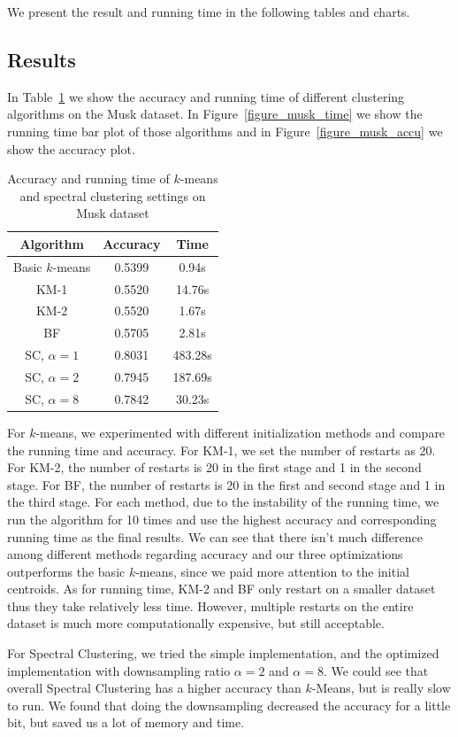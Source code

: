 \documentclass{acm_proc_article-sp}
\begin{document}
We present the result and running time in the following tables and charts.

\subsection{Results}
In Table~\ref{table_musk} we show the accuracy and running time of different clustering algorithms on the Musk dataset. In Figure~\ref{figure_musk_time} we show the running time bar plot of those algorithms and in Figure~\ref{figure_musk_accu} we show the accuracy plot. 

\begin{table}[h]
\centering
\begin{tabular}{|c|cc|}
\hline
Algorithm & Accuracy & Time \\
\hline
 Basic $k$-means & 0.5399 & 0.94s\\
 KM-1 & 0.5520 & 14.76s\\
 KM-2 & 0.5520 & 1.67s\\
 BF & 0.5705 & 2.81s\\
 SC, $\alpha=1$ & 0.8031 & 483.28s\\
 SC, $\alpha=2$ & 0.7945 & 187.69s\\
 SC, $\alpha=8$ & 0.7842 & 30.23s\\
 \hline
\end{tabular}
\caption{Accuracy and running time of $k$-means and spectral clustering settings on Musk dataset}
\label{table_musk}
\end{table}

For $k$-means, we experimented with different initialization methods and compare the running time and accuracy. For KM-1, we set the number of restarts as 20. For KM-2, the number of restarts is 20 in the first stage and 1 in the second stage. For BF, the number of restarts is 20 in the first and second stage and 1 in the third stage. For each method, due to the instability of the running time, we run the algorithm for 10 times and use the highest accuracy and corresponding running time as the final results. We can see that there isn't much difference among different methods regarding accuracy and our three optimizations outperforms the basic $k$-means, since we paid more attention to the initial centroids. As for running time, KM-2 and BF only restart on a smaller dataset thus they take relatively less time. However, multiple restarts on the entire dataset is much more computationally expensive, but still acceptable.

For Spectral Clustering, we tried the simple implementation, and the optimized implementation with downsampling ratio $\alpha=2$ and $\alpha=8$. We could see that overall Spectral Clustering has a higher accuracy than $k$-Means, but is really slow to run. We found that doing the downsampling decreased the accuracy for a little bit, but saved us a lot of memory and time.\\
\end{document}
